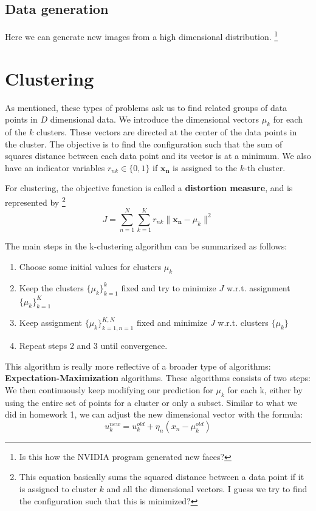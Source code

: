 \documentclass{tufte-handout}
\begin{document}
	\subsection{Data generation}
		Here we can generate new images from a high dimensional distribution.
		\footnote{Is this how the NVIDIA program generated new faces?}

\section{Clustering}
	As mentioned, these types of problems ask us to find related groups of data points in $D$ dimensional
	data.
	We introduce the dimensional vectors $\mu_{k}$ for each of the $k$ clusters.
	These vectors are directed at the center of the data points in the cluster.
	The objective is to find the configuration such that the sum of squares distance between each data point
	and its vector is at a minimum.
	We also have an indicator variables $r_{nk}\in \{0,1\}$ if $\mathbf{x_{n}}$ is assigned to the $k$-th cluster.
	
	For clustering, the objective function is called a \textbf{distortion measure}, and is represented by 
	\footnote{ This equation basically sums the squared distance between a data point if it is assigned to 
		cluster $k$ and all the dimensional vectors. I guess we try to find the configuration such that this 
		is minimized?
	}
	\[ J = \sum_{n=1}^{N}\sum_{k=1}^{K}r_{nk}\|\mathbf{x_{n}} - \mu_{k}\|^{2}\]

	The main steps in the k-clustering algorithm can be summarized as follows:
	\begin{enumerate}
		\item Choose some initial values for clusters $\mu_{k}$
		\item Keep the clusters $\{\mu_{k}\}_{k=1}^{k}$ fixed and try to minimize $J$ w.r.t. assignment
				$\{\mu_{k}\}_{k=1}^{K}$
		\item Keep assignment $\{\mu_{k}\}_{k=1,n=1}^{K,N}$ fixed and minimize $J$ w.r.t. clusters 
				$\{\mu_{k}\}$
		\item Repeat steps 2 and 3 until convergence.
	\end{enumerate}

	This algorithm is really more reflective of a broader type of algorithms: \textbf{Expectation-Maximization}
		algorithms.
	These algorithms consists of two steps:
	We then continuously keep modifying our prediction for $\mu_{k}$ for each k, either by using the entire
		set of points for a cluster or only a subset. 
	Similar to what we did in homework 1, we can adjust the new dimensional vector with the formula:
	\[u_{k}^{new} = u_{k}^{old} + \eta_{n}(x_{n} - \mu_{k}^{old})\]
\end{document}
